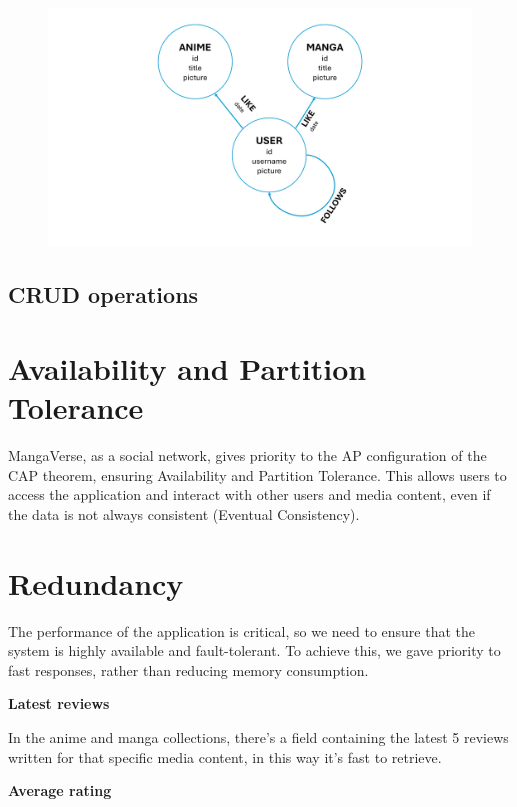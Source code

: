 \begin{figure}[htbp]\label{fig:GraphDB}
    \centering
    \includegraphics[width=\textwidth]{Media/graph.pdf}
\end{figure}

\newpage

\subsection{CRUD operations}

\section{Availability and Partition Tolerance}
MangaVerse, as a social network, gives priority to the AP configuration of the CAP theorem, ensuring Availability and Partition Tolerance. This allows users to access the application and interact with other users and media content, even if the data is not always consistent (Eventual Consistency).

\section{Redundancy}
The performance of the application is critical, so we need to ensure that the system is highly available and fault-tolerant. To achieve this, we gave priority to fast responses, rather than reducing memory consumption.


\textbf{Latest reviews}


In the anime and manga collections, there's a field containing the latest 5 reviews written for that specific media content, in this way it's fast to retrieve. 


\textbf{Average rating}


